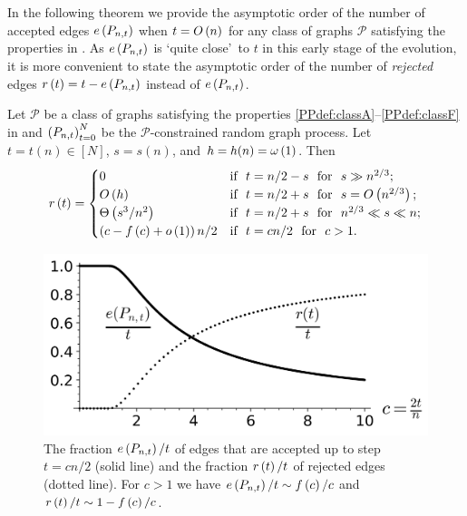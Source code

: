 In the following theorem we provide the asymptotic order of the number of accepted edges $e\left({P_{n,t}}\right)$ when $t=O\left(n\right)$ for any class of graphs $\mathcal{P}$ satisfying the properties in . As $e\left({P_{n,t}}\right)$ is \lq quite close\rq\ to $t$ in this early stage of the evolution, it is more convenient to state the asymptotic order of the number of {\em rejected} edges $r\left(t\right)=t-e\left({P_{n,t}}\right)$ instead of $e\left({P_{n,t}}\right)$.
\begin{thm}\label{PPthm:main}
	Let $\mathcal{P}$ be a class of graphs satisfying the properties \ref{PPdef:classA}--\ref{PPdef:classF} in  and $\left(P_{n,t}\right)_{t=0}^{N}$ be the $\mathcal{P}$-constrained random graph process. Let $t=t(n)\in\left[N\right]$, $s=s(n)$, and $h=h(n)=\omega\left(1\right)$. Then \whp
	\begin{align*}
	r\left(t\right)=
	\begin{cases}
	0 & \text{if} ~~ t=n/2-s ~~\text{for}~~ s\gg n^{2/3};
	\\
	O\left(h\right)& \text{if} ~~ t=n/2+s ~~\text{for}~~ s=O\left(n^{2/3}\right);
	\\
	\Theta\left(s^3/n^2\right)& \text{if} ~~ t=n/2+s ~~\text{for}~~ n^{2/3}\ll s\ll n;
	\\
	\left(c-f\left(c\right)+o\left(1\right)\right)n/2& \text{if} ~~ t=cn/2 ~~\text{for}~~ c>1.
	\end{cases}
	\end{align*}
\end{thm}

\begin{figure}[t]
\centering
	\includegraphics[scale=0.6]{process-fraction.png}
	\caption{The fraction $e\left({P_{n,t}}\right)/t$ of edges that are accepted up to step $t=cn/2$ (solid line) and the fraction $r\left(t\right)/t$ of rejected edges (dotted line). For $c>1$ we have $e\left({P_{n,t}}\right)/t\sim f\left(c\right)/c$ and $r\left(t\right)/t\sim 1-f\left(c\right)/c$.}
	\label{PPfig:fraction}
\end{figure}

